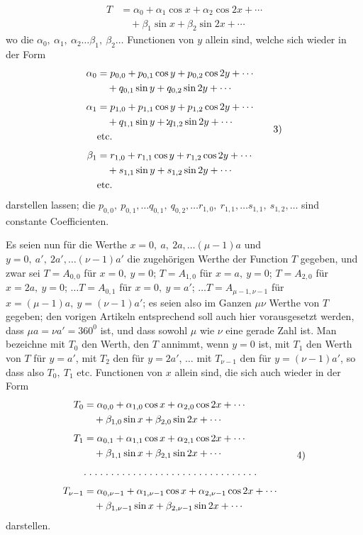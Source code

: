 \begin{landscape}
\[
\begin{aligned}
T&=\alpha_0+\alpha_1\cos x+\alpha_2\cos2x+\cdots\\
 &\quad+\beta_1\sin x+\beta_2\sin2x+\cdots
\end{aligned}\tag*{2)}
\]
wo die \(\alpha_0,\ \alpha_1,\ \alpha_2\ldots\beta_1,\ \beta_2\ldots\) Functionen von \(y\) allein sind, welche sich wieder in der Form
\[
\begin{aligned}
\alpha_0&=p_{0,0}+p_{0,1}\cos y+p_{0,2}\cos2y+\cdots\\
 &\quad+q_{0,1}\sin y+q_{0,2}\sin2y+\cdots\\[4pt]
\alpha_1&=p_{1,0}+p_{1,1}\cos y+p_{1,2}\cos2y+\cdots\\
 &\quad+q_{1,1}\sin y+\VFivePair q_{1,2}\sin2y+\cdots\\
 &\text{etc.}\\[4pt]
\beta_1&=r_{1,0}+r_{1,1}\cos y+r_{1,2}\cos2y+\cdots\\
 &\quad+s_{1,1}\sin y+s_{1,2}\sin2y+\cdots\\
 &\text{etc.}
\end{aligned}\tag*{3)}
\]
darstellen lassen; die \(p_{0,0},\ p_{0,1},\ldots q_{0,1},\ q_{0,2},\ldots r_{1,0},\ r_{1,1},\ldots s_{1,1},\ s_{1,2},\ldots\) sind constante Coefficienten.

\par\noindent\hspace*{\parindent}Es seien nun für die Werthe \(x=0,\ a,\ 2a,\ldots(\mu-1)a\) und \(y=0,\ a',\ 2a',\ldots(\nu-1)a'\) die zugehörigen Werthe der Function \(T\) gegeben, und zwar sei \(T=A_{0,0}\) für \(x=0,\ y=0\); \(T=A_{1,0}\) für \(x=a,\ y=0\); \(T=A_{2,0}\) für \(x=2a,\ y=0\); \(\ldots T=A_{0,1}\) für \(x=0,\ y=a'\); \(\ldots T=A_{\mu-1,\nu-1}\) für \(x=(\mu-1)a,\ y=(\nu-1)a'\); es seien also im Ganzen \(\mu\nu\) Werthe von \(T\) gegeben; den vorigen Artikeln entsprechend soll auch hier vorausgesetzt werden, dass \(\mu a=\nu a'=360^0\) ist, und dass sowohl \(\mu\) wie \(\nu\) eine gerade Zahl ist. Man bezeichne mit \(T_0\) den Werth, den \(T\) annimmt, wenn \(y=0\) ist, mit \(T_1\) den Werth von \(T\) für \(y=a'\), mit \(T_2\) den für \(y=2a'\), \(\ldots\) mit \(T_{\nu-1}\) den für \(y=(\nu-1)a'\), so dass also \(T_0,\ T_1\) etc. Functionen von \(x\) allein sind, die sich auch wieder in der Form
\[
\begin{aligned}
T_0&=\alpha_{0,0}+\alpha_{1,0}\cos x+\alpha_{2,0}\cos2x+\cdots\\
 &\quad+\beta_{1,0}\sin x+\beta_{2,0}\sin2x+\cdots\\[4pt]
T_1&=\alpha_{0,1}+\alpha_{1,1}\cos x+\alpha_{2,1}\cos2x+\cdots\\
 &\quad+\beta_{1,1}\sin x+\beta_{2,1}\sin2x+\cdots\\[4pt]
 &\mathord{.}\mkern5mu\mathord{.}\mkern5mu\mathord{.}\mkern5mu\mathord{.}\mkern5mu\mathord{.}\mkern5mu\mathord{.}\mkern5mu\mathord{.}\mkern5mu\mathord{.}\mkern5mu\mathord{.}\mkern5mu\mathord{.}\mkern5mu\mathord{.}\mkern5mu\mathord{.}\mkern5mu\mathord{.}\mkern5mu\mathord{.}\mkern5mu\mathord{.}\mkern5mu\mathord{.}\mkern5mu\mathord{.}\mkern5mu\mathord{.}\mkern5mu\mathord{.}\mkern5mu\mathord{.}\mkern5mu\mathord{.}\mkern5mu\mathord{.}\mkern5mu\mathord{.}\mkern5mu\mathord{.}\mkern5mu\mathord{.}\mkern5mu\mathord{.}\mkern5mu\mathord{.}\mkern5mu\mathord{.}\mkern5mu\mathord{.}\mkern5mu\mathord{.}\mkern5mu\mathord{.}\mkern5mu\mathord{.}\mkern5mu\\[4pt]
T_{\nu-1}&=\alpha_{0,\nu-1}+\alpha_{1,\nu-1}\cos x+\alpha_{2,\nu-1}\cos2x+\cdots\\
 &\quad+\beta_{1,\nu-1}\sin x+\beta_{2,\nu-1}\sin2x+\cdots
\end{aligned}\tag*{4)}
\]
darstellen.


\end{landscape}
